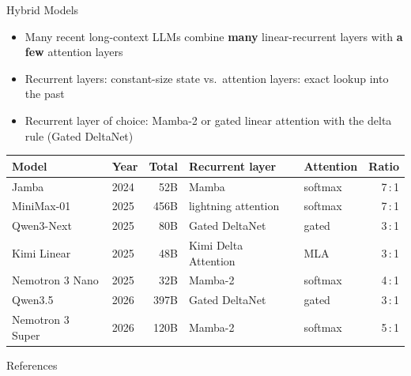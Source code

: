 \documentclass[11pt,compress,t,notes=noshow, xcolor=table]{beamer}
\begin{document}



\begin{frame}{Hybrid Models}

\vfill

\begin{itemize}
  \item Many recent long-context LLMs combine \textbf{many} linear-recurrent layers with \textbf{a few} attention layers
  \item Recurrent layers: constant-size state vs.\ attention layers: exact lookup into the past
  \item Recurrent layer of choice: Mamba-2 or gated linear attention with the delta rule (Gated DeltaNet) 
\end{itemize}

\medskip


\begin{center}
\footnotesize
\setlength{\tabcolsep}{4.5pt}
\begin{tabular}{@{}llrllr@{}}
  \toprule
  Model             & Year & Total & Recurrent layer      & Attention & Ratio \\
  \midrule
  Jamba             & 2024 & 52B   & Mamba                & softmax   & 7\,:\,1 \\
  MiniMax-01        & 2025 & 456B  & lightning attention  & softmax   & 7\,:\,1 \\
  Qwen3-Next        & 2025 & 80B   & Gated DeltaNet       & gated     & 3\,:\,1 \\
  Kimi Linear       & 2025 & 48B   & Kimi Delta Attention & MLA       & 3\,:\,1 \\
  Nemotron 3 Nano   & 2025 & 32B   & Mamba-2              & softmax   & 4\,:\,1 \\
  Qwen3.5           & 2026 & 397B  & Gated DeltaNet       & gated     & 3\,:\,1 \\
  Nemotron 3 Super  & 2026 & 120B  & Mamba-2              & softmax   & 5\,:\,1 \\
  \bottomrule
\end{tabular}
\end{center}

\vfill

\end{frame}





 
 

\begin{frame}{References}
\vfill
        \tiny
        
\vfill
\end{frame}

\endlecture
\end{document}

